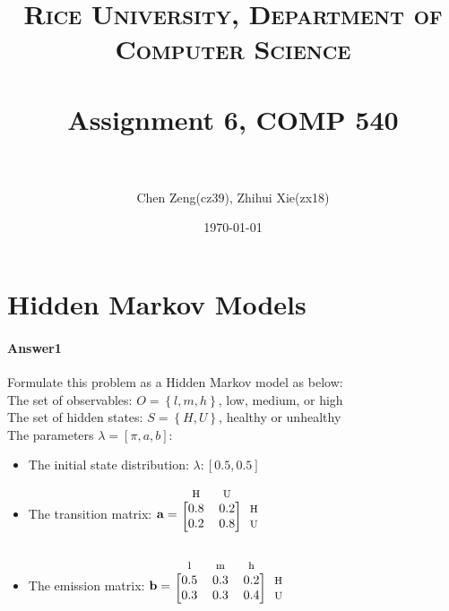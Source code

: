 \documentclass[paper=a4, fontsize=11pt]{scrartcl} %
\title{	
\normalfont \normalsize
\textsc{Rice University, Department of Computer Science} \\ [25pt] %
\horrule{0.5pt} \\[0.4cm] %
\huge Assignment 6, COMP 540 \\ %
\horrule{2pt} \\[0.5cm] %
}
\author{Chen Zeng(cz39), Zhihui Xie(zx18)} %
\date{\normalsize\today} %
\numberwithin{equation}{section} %
\numberwithin{figure}{section} %
\numberwithin{table}{section} %
\begin{document}
\maketitle %

\section{Hidden Markov Models}
\paragraph{\textbf{Answer1}}
Formulate this problem as a Hidden Markov model as below:
\\ The set of observables: $O=\left \{ l, m, h \right \}$, low, medium, or high
\\ The set of hidden states: $S=\left \{ H, U \right \}$, healthy or unhealthy
\\ The parameters $\lambda =\left [ \pi ,a,b \right ]$: 
\begin{itemize}
  \item The initial state distribution: $\lambda :\left [ 0.5, 0.5 \right ]$
  \item The transition matrix: 
	$ \mathbf{a}=
 	 \begin{blockarray}{*{2}{c} l}
    	\begin{block}{*{2}{>{$\footnotesize}c<{$}} l}
     	 H & U & \\
   	 \end{block}
   	 \begin{block}{[*{2}{c}]>{$\footnotesize}l<{$}}
      	0.8 & 0.2 & H \\
      	0.2 & 0.8 & U \\
    	\end{block}
  	\end{blockarray}$
  \item The emission matrix:
	 $\mathbf{b}=
 	 \begin{blockarray}{*{3}{c} l}
    	\begin{block}{*{3}{>{$\footnotesize}c<{$}} l}
     	 l & m & h &\\
   	 \end{block}
   	 \begin{block}{[*{3}{c}]>{$\footnotesize}l<{$}}
      	0.5 & 0.3 & 0.2 & H \\
      	0.3 & 0.3 & 0.4 & U \\
    	\end{block}
  	\end{blockarray}$
\end{itemize}
\end{document}
